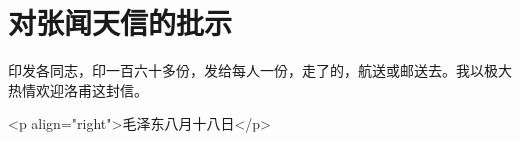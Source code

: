 \section[对张闻天信的批示（一九五九年八月十八日）]{对张闻天信的批示}


印发各同志，印一百六十多份，发给每人一份，走了的，航送或邮送去。我以极大热情欢迎洛甫这封信。

<p align="right">毛泽东八月十八日</p>


